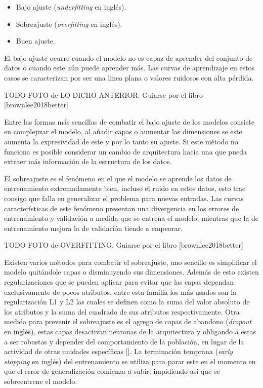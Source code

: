 \begin{itemize}
	\item Bajo ajuste (\emph{underfitting} en inglés).
	\item Sobreajuste (\emph{overfitting} en inglés).
	\item Buen ajuste.
\end{itemize}

El bajo ajuste ocurre cuando el modelo no es capaz de aprender del conjunto de datos o cuando este aún puede aprender 
más. Las curvas de aprendizaje en estos casos se caracterizan por ser una linea plana o valores ruidosos con alta pérdida.

TODO FOTO de LO DICHO ANTERIOR. Guiarse por el libro [brownlee2018better]

Entre las formas más sencillas de combatir el bajo ajuste de los modelos consiste en complejizar el modelo, al añadir
capas o aumentar las dimensiones se este aumenta la expresividad de este y por lo tanto su ajuste. Si este método 
no funciona es posible considerar un cambio de arquitectura hacia una que pueda extraer más información de la 
estructura de los datos. 

El sobreajuste es el fenómeno en el que el modelo se aprende los datos de entrenamiento extremadamente bien, incluso
el ruido en estos datos, esto trae consigo que falla en generalizar el problema para nuevas entradas. Las curvas 
características de este fenómeno presentan una divergencia en los errores de entrenamiento y validación a medida
que se entrena el modelo, mientras que la de entrenamiento mejora la de validación tiende a empeorar. 

TODO FOTO de OVERFITTING. Guiarse por el libro [brownlee2018better]

Existen varios métodos para combatir el sobreajuste, uno sencillo es simplificar el modelo quitándole capas 
o disminuyendo sus dimensiones. Además de esto existen regularizaciones que se pueden aplicar para evitar que 
las capas dependan exclusivamente de pocos atributos, entre esta familia los más usados son la regularización
L1 y L2 las cuales se definen como la suma del valor absoluto de los atributos y la suma del cuadrado de sus 
atributos respectivamente. Otra medida para prevenir el sobreajuste es el agrego de capas de abandono 
(\emph{dropout} en inglés), estas capas desactivan neuronas de la arquitectura y obligando a 
estas a ser robustas y depender del comportamiento de la población, en lugar de la actividad de otras unidades 
específicas [\cite{baldi2013dropout}]. La terminación temprana (\emph{early stopping} en inglés) del entrenamiento
se utiliza para parar este en el momento en que el error de generalización comienza a subir, impidiendo así que 
se sobreentrene el modelo.

